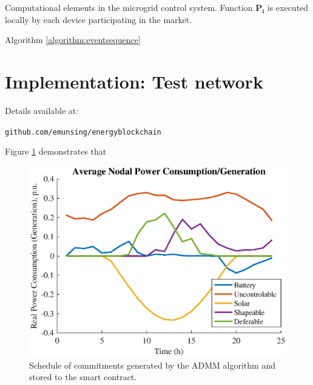 \begin{algorithm}
 \DontPrintSemicolon
  \caption{Computational elements in the microgrid control system. Function $\mathbf{P_i}$ is executed locally by each device participating in the market.} \label{algorithm:eventsequence}
\end{algorithm}

Algorithm \ref{algorithm:eventsequence} \lipsum[5]



\section{Implementation: Test network}
\label{sec:implementation}

Details available at:

\texttt{github.com/emunsing/energyblockchain}


Figure \ref{fig:power} demonstrates that \lipsum[6]

\begin{figure} 
\centering
\includegraphics[scale = 0.52]{Power.eps}
\caption{Schedule of commitments generated by the ADMM algorithm and stored to the smart contract.}
\label{fig:power}
\end{figure}

